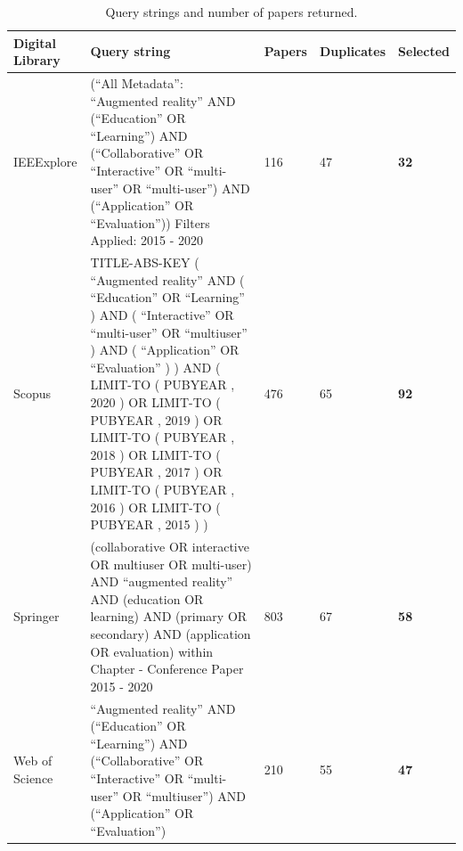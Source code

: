 \begin{table}[htbp]
\centering
\caption {Query strings and number of papers returned.}\label{tab:searchstring}
\begin{tabular}{|M{2cm}||M{8.5cm}|M{1.25cm}|M{1.65cm}|M{1.3cm}|}
    \hline
         \textbf{Digital Library} & \textbf{Query string} & \textbf{Papers} & \textbf{Duplicates} & \textbf{Selected} \\
    \hline
    \hline
         IEEExplore    &  (``All Metadata'': ``Augmented reality'' AND (``Education'' OR ``Learning'') AND (``Collaborative'' OR ``Interactive'' OR ``multi-user'' OR ``multi-user'') AND (``Application'' OR ``Evaluation'')) Filters Applied: 2015 - 2020 & 116 & 47 & \textbf{32} \\
    \hline
        Scopus         & TITLE-ABS-KEY ( ``Augmented reality''  AND  ( ``Education''  OR  ``Learning'' )  AND  ( ``Interactive''  OR  ``multi-user''  OR  ``multiuser'' )  AND  ( ``Application''  OR  ``Evaluation'' ) )  AND  ( LIMIT-TO ( PUBYEAR ,  2020 )  OR  LIMIT-TO ( PUBYEAR ,  2019 )  OR  LIMIT-TO ( PUBYEAR ,  2018 )  OR  LIMIT-TO ( PUBYEAR ,  2017 )  OR  LIMIT-TO ( PUBYEAR ,  2016 )  OR  LIMIT-TO ( PUBYEAR ,  2015 ) )    & 476 & 65 & \textbf{92} \\
    \hline
        Springer       & (collaborative OR interactive OR multiuser OR multi-user) AND ``augmented reality'' AND (education OR learning) AND (primary OR secondary) AND (application OR evaluation)
within Chapter - Conference Paper  2015 - 2020  & 803 & 67 & \textbf{58} \\
    \hline
        Web of Science & ``Augmented reality'' AND (``Education'' OR ``Learning'') AND (``Collaborative'' OR ``Interactive'' OR ``multi-user'' OR ``multiuser'') AND (``Application'' OR ``Evaluation'') & 210 & 55 & \textbf{47} \\
    \hline

\end{tabular}
\end{table}